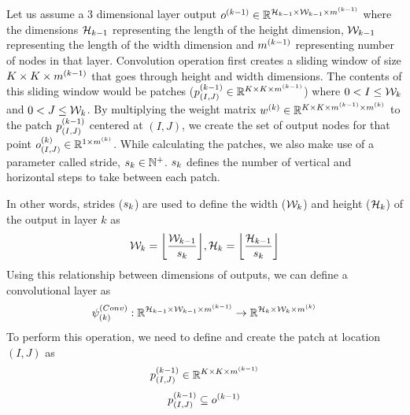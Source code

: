 Let us assume a 3 dimensional layer output $o^{(k-1)} \in \mathbb{R}^{\mathcal{H}_{k-1} \times \mathcal{W}_{k-1} \times m^{(k-1)}}$ where the dimensions $\mathcal{H}_{k-1}$ representing the length of the height dimension, $\mathcal{W}_{k-1}$ representing the length of the width dimension and $m^{(k-1)}$ representing number of nodes in that layer. Convolution operation first creates a sliding window of size $K \times K \times m^{(k-1)}$ that goes through height and width dimensions. The contents of this sliding window would be patches ($p^{(k-1)}_{(I,J)} \in \mathbb{R}^{K \times K \times m^{(k-1)}}$) where $0 < I \leq \mathcal{W}_{k}$ and $0 < J \leq \mathcal{W}_{k}$. By multiplying the weight matrix $w^{(k)} \in \mathbb{R}^{K \times K \times m^{(k-1)} \times m^{(k)}}$ to the patch $p^{(k-1)}_{(I,J)}$  centered at $(I,J)$, we create the set of output nodes for that point $o^{(k)}_{(I,J)} \in \mathbb{R}^{1 \times m^{(k)}}$. While calculating the patches, we also make use of a parameter called stride, $s_{k} \in \mathbb{N}^+$. $s_{k}$ defines the number of vertical and horizontal steps to take between each patch.

In other words, strides ($s_{k}$) are used to define the width ($\mathcal{W}_{k}$) and height ($\mathcal{H}_{k}$) of the output in layer $k$ as
$$ \widthk{k} = \floor*{\frac{\widthk{k-1}}{\sk{k}}}, \heightk{k} = \floor*{\frac{\heightk{k-1}}{\sk{k}}}$$
Using this relationship between dimensions of outputs, we can define a convolutional layer as
$$ \psi^{(Conv)}_{(k)} : \mathbb{R}^{\mathcal{H}_{k-1} \times \mathcal{W}_{k-1} \times m^{(k-1)} } \rightarrow \mathbb{R}^{\mathcal{H}_{k} \times \mathcal{W}_{k} \times m^{(k)} } $$
To perform this operation, we need to define and create the patch at location $(I,J)$ as 
$$ p^{(k-1)}_{(I,J)} \in \mathbb{R}^{K \times K \times m^{(k-1)}} $$
$$ p^{(k-1)}_{(I,J)} \subseteq o^{(k-1)}$$

